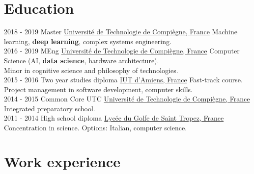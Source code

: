 \documentclass[letterpaper]{twentysecondcv} %
\begin{document}
\makeprofile %


\section{Education}

\begin{twenty} %
	\twentyitem
    	{2018 - 2019}
        {}
        {Master}
        {\href{https://www.utc.fr/}{Université de Technologie de Compiègne, France}}
        {}
        {Machine learning, \textbf{deep learning}, complex systems engineering.}
    \\
	\twentyitem
    	{2016 - 2019}
        {}
        {MEng}
        {\href{https://www.utc.fr/}{Université de Technologie de Compiègne, France}}
        {}
        {Computer Science (AI, \textbf{data science}, hardware architecture).\\Minor in cognitive science and philosophy of technologies.}
    \\
	\twentyitem
    	{2015 - 2016}
        {}
        {Two year studies diploma}
        {\href{http://www.iut-amiens.fr/}{IUT d'Amiens, France}}
        {}
        {Fast-track course.\\Project management in software development, computer skills.}
    \\
	\twentyitem
    	{2014 - 2015}
        {}
        {Common Core UTC}
        {\href{https://www.utc.fr/}{Université de Technologie de Compiègne, France}}
        {}
        {Integrated preparatory school.}
    \\
	\twentyitem
    	{2011 - 2014}
		{}
        {High school diploma}
        {\href{http://www.lyc-du-golfe-de-saint-tropez.ac-nice.fr/}{Lycée du Golfe de Saint Tropez, France}}
        {}
        {Concentration in science. Options: Italian, computer science.}
\end{twenty}


\section{Work experience}
\end{document}

